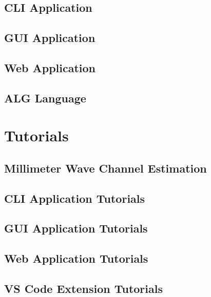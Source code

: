 \documentclass[use boldface]{beaulivre}
\begin{document}
\chapter{CLI Application}


\chapter{GUI Application}


\chapter{Web Application}


\chapter{ALG Language}\label{d:chap:alg_lang}


\part{Tutorials}

\chapter{Millimeter Wave Channel Estimation}


\chapter{CLI Application Tutorials}
\chapter{GUI Application Tutorials}
\chapter{Web Application Tutorials}
\chapter{VS Code Extension Tutorials}


\appendix

\cleardoublepage
\cleardoublepage
{}
{}
\end{document}
